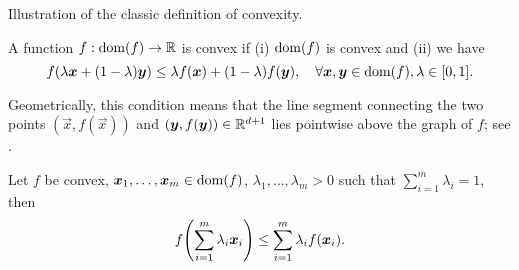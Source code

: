 \begin{marginfigure}
    \centering
    \caption{Illustration of the classic definition of convexity.}
    \label{fig:convexity}
\end{marginfigure}

\begin{definition}[Convexity]
    A function $f: \mathrm{dom}(f) \to \mathbb{R}$ is convex if (i) $\mathrm{dom}(f)$ is convex and (ii) we have \[
        f(\lambda \bm{x} + (1-\lambda) \bm{y}) \leq \lambda f(\bm{x}) + (1-\lambda) f(\bm{y}), \quad \forall \bm{x}, \bm{y} \in \mathrm{dom}(f), \lambda\in[0,1].
    \]
\end{definition}

Geometrically, this condition means that the line segment connecting the two points
$(\vec{x},f(\vec{x}))$ and $(\bm{y},f(\bm{y})) \in \mathbb{R}^{d+1}$ lies pointwise above the graph of
$f$; see .

%
%

\begin{lemma}
    Let $f$ be convex, $\bm{x}_1,\ldots,\bm{x}_m\in\mathrm{dom}(f)$, $\lambda_1,\ldots,\lambda_m > 0$ such that $\sum_{i=1}^m \lambda_i = 1$, then \[
        f \lft( \sum_{i=1}^m \lambda_i \vec{x}_i \rgt) \leq \sum_{i=1}^{m} \lambda_i f(\vec{x}_i).
    \]
\end{lemma}

